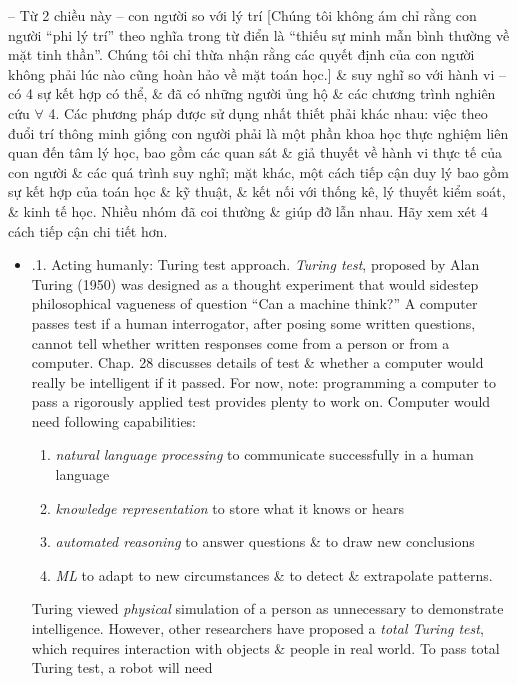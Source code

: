 \documentclass{article}
\begin{document}
\begin{itemize}
\begin{itemize}
\begin{itemize}
			--  Từ 2 chiều này -- con người so với lý trí [Chúng tôi không ám chỉ rằng con người ``phi lý trí'' theo nghĩa trong từ điển là ``thiếu sự minh mẫn bình thường về mặt tinh thần''. Chúng tôi chỉ thừa nhận rằng các quyết định của con người không phải lúc nào cũng hoàn hảo về mặt toán học.] \& suy nghĩ so với hành vi -- có 4 sự kết hợp có thể, \& đã có những người ủng hộ \& các chương trình nghiên cứu $\forall$ 4. Các phương pháp được sử dụng nhất thiết phải khác nhau: việc theo đuổi trí thông minh giống con người phải là một phần khoa học thực nghiệm liên quan đến tâm lý học, bao gồm các quan sát \& giả thuyết về hành vi thực tế của con người \& các quá trình suy nghĩ; mặt khác, một cách tiếp cận duy lý bao gồm sự kết hợp của toán học \& kỹ thuật, \& kết nối với thống kê, lý thuyết kiểm soát, \& kinh tế học. Nhiều nhóm đã coi thường \& giúp đỡ lẫn nhau. Hãy xem xét 4 cách tiếp cận chi tiết hơn.
			\begin{itemize}
				\item {.1. Acting humanly: Turing test approach.} {\it Turing test}, proposed by {\sc Alan Turing} (1950) was designed as a thought experiment that would sidestep philosophical vagueness of question ``Can a machine think?'' A computer passes test if a human interrogator, after posing some written questions, cannot tell whether written responses come from a person or from a computer. Chap. 28 discusses details of test \& whether a computer would really be intelligent if it passed. For now, note: programming a computer to pass a rigorously applied test provides plenty to work on. Computer would need following capabilities:
				\begin{enumerate}
					\item {\it natural language processing} to communicate successfully in a human language
					\item {\it knowledge representation} to store what it knows or hears
					\item {\it automated reasoning} to answer questions \& to draw new conclusions
					\item {\it ML} to adapt to new circumstances \& to detect \& extrapolate patterns.
				\end{enumerate}
				{\sc Turing} viewed {\it physical} simulation of a person as unnecessary to demonstrate intelligence. However, other researchers have proposed a {\it total Turing test}, which requires interaction with objects \& people in real world. To pass total Turing test, a robot will need
				\begin{enumerate}

\end{enumerate}
\end{itemize}
\end{itemize}
\end{itemize}
\end{itemize}
\end{document}
